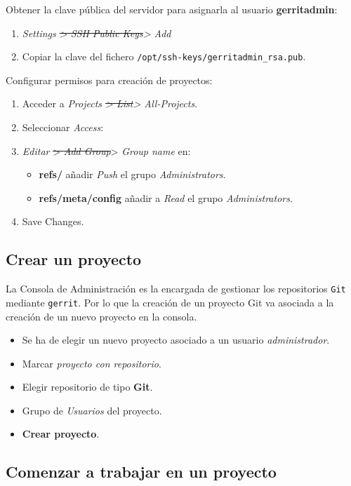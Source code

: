 Obtener la clave pública del servidor para asignarla al usuario
\textbf{gerritadmin}:

\begin{enumerate}
\item
  \emph{Settings \sout{\textgreater{} SSH Public Keys}\textgreater{}
  Add}
\item
  Copiar la clave del fichero
  \texttt{/opt/ssh-keys/gerritadmin\_rsa.pub}.
\end{enumerate}
Configurar permisos para creación de proyectos:

\begin{enumerate}
\item
  Acceder a \emph{Projects \sout{\textgreater{} List}\textgreater{}
  All-Projects}.
\item
  Seleccionar \emph{Access}:
\item
  \emph{Editar} \sout{\textgreater{} \emph{Add Group}}\textgreater{}
  \emph{Group name} en:
  \begin{itemize}
  \item
    \textbf{refs/} añadir \emph{Push} el grupo \emph{Administrators}.
  \item
    \textbf{refs/meta/config} añadir a \emph{Read} el grupo
    \emph{Administrators}.
  \end{itemize}
\item
  Save Changes.
\end{enumerate}
\subsection{Crear un proyecto}

La Consola de Administración es la encargada de gestionar los
repositorios \texttt{Git} mediante \texttt{gerrit}. Por lo que la
creación de un proyecto Git va asociada a la creación de un nuevo
proyecto en la consola.

\begin{itemize}
\item
  Se ha de elegir un nuevo proyecto asociado a un usuario
  \emph{administrador}.
\item
  Marcar \emph{proyecto con repositorio}.
\item
  Elegir repositorio de tipo \textbf{Git}.
\item
  Grupo de \emph{Usuarios} del proyecto.
\item
  \textbf{Crear proyecto}.
\end{itemize}
\subsection{Comenzar a trabajar en un proyecto}

